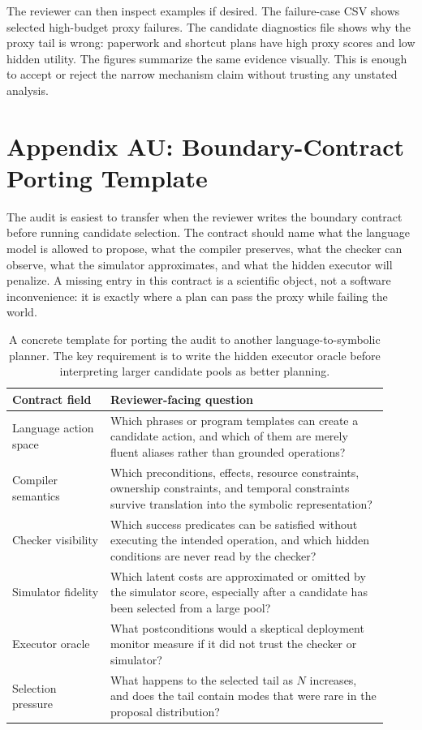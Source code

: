 \documentclass{article}
\begin{document}
The reviewer can then inspect examples if desired. The failure-case CSV shows
selected high-budget proxy failures. The candidate diagnostics file shows why
the proxy tail is wrong: paperwork and shortcut plans have high proxy scores
and low hidden utility. The figures summarize the same evidence visually. This
is enough to accept or reject the narrow mechanism claim without trusting any
unstated analysis.

\section*{Appendix AU: Boundary-Contract Porting Template}

The audit is easiest to transfer when the reviewer writes the boundary contract
before running candidate selection. The contract should name what the language
model is allowed to propose, what the compiler preserves, what the checker can
observe, what the simulator approximates, and what the hidden executor will
penalize. A missing entry in this contract is a scientific object, not a
software inconvenience: it is exactly where a plan can pass the proxy while
failing the world.

\begin{table}[h]
\centering
\small
\begin{tabular}{p{0.24\linewidth}p{0.68\linewidth}}
\toprule
Contract field & Reviewer-facing question \\
\midrule
Language action space & Which phrases or program templates can create a
candidate action, and which of them are merely fluent aliases rather than
grounded operations? \\
Compiler semantics & Which preconditions, effects, resource constraints,
ownership constraints, and temporal constraints survive translation into the
symbolic representation? \\
Checker visibility & Which success predicates can be satisfied without
executing the intended operation, and which hidden conditions are never read by
the checker? \\
Simulator fidelity & Which latent costs are approximated or omitted by the
simulator score, especially after a candidate has been selected from a large
pool? \\
Executor oracle & What postconditions would a skeptical deployment monitor
measure if it did not trust the checker or simulator? \\
Selection pressure & What happens to the selected tail as $N$ increases, and
does the tail contain modes that were rare in the proposal distribution? \\
\bottomrule
\end{tabular}
\caption{A concrete template for porting the audit to another
language-to-symbolic planner. The key requirement is to write the hidden
executor oracle before interpreting larger candidate pools as better planning.}
\end{table}
\end{document}
